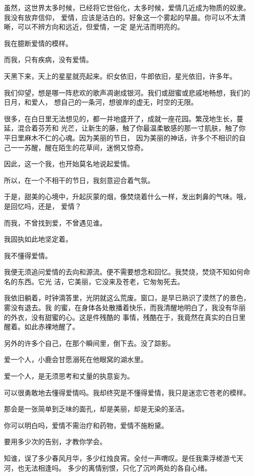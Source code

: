		虽然，这世界太多时候，已经将它世俗化，太多时候，爱情几近成为物质的奴隶。我没有放弃信仰，
	爱情，应该是洁白的。好象这一个雾起的早晨。你可以不太清晰，可以不辨方向和远近，但爱情，一定
	是光洁而明亮的。


		我在臆断爱情的模样。

		而我，只有疾病，没有爱情。


		天黑下来，天上的星星就亮起来。织女依旧，牛郎依旧，星光依旧，许多年。


		我们仰望，想是哪一阵悲欢的歌声凋谢成银河。我们或甜蜜或悲戚地畅想，我们的日月，和爱人，
	想自己的一条河，想彼岸的虚无，时空的无限。

		很多，在白日里无法想见的，都一并地盛开了，成就一座花园。繁茂地生长，蔓延，混合着芬芳和
	光芒，让新生的藤，触了你最温柔敏感的那一寸肌肤，触了你平日里麻木不仁的心魂。因为美丽的节日，
	因为美丽的神话，许多个不相识的自己一一苏醒，醒在陌生的花草间，迷惘又惊奇。

		因此，这一个我，也开始莫名地说起爱情。

		所以，在一个不相干的节日，我刻意迎合着气氛。

		于是，甜美的心境中，升起灰蒙的烟，像焚烧着什么一样，发出刺鼻的气味。哦，是回忆吗，还是，
	爱情？

		而我，不曾找到爱，不曾遇见谁。


		我固执如此地坚定着。

		我不懂得爱情。


		我便无须追问爱情的去向和源流。便不需要想念和回忆。我焚烧，焚烧不知如何命名的东西。它光
	洁，它美丽，它没来及苍老，它匆匆死去。


		我依旧躺着，时钟滴答里，光阴就这么荒废。窗口，是早已熟识了漠然了的景色，雾没有退去。我
	的蜜，在身体各处散播着快乐，而我清醒地明白了，我没有华丽的外衣，没有甜蜜的心。这是件残酷的
	事情，残酷在于，我竟然在真实的白日里醒着。如此赤裸地醒了。


		另外的许多个自己，在那个瞬间里，倒下去。没了踪影。

		爱一个人，小鹿会甘愿溺死在他眼窝的湖水里。

		爱一个人，是无须思考和丈量的执意妄为。

		可以很勇敢地去懂得爱情吗。我却终究是不懂得爱情，我只是迷恋它苍老的模样。

		那会是一张简单到乏味的面孔，却是美丽，却是无染的圣洁。

		你可以明白吗，爱情不需治疗和药物，爱情不施粉黛。

		要用多少次的告别，才教你学会。


		知谁，误了多少春风月华，多少红烛良宵。全付一声喟叹。是任我乘浮槎游弋天河，也无法相逢吗。
	多少的离情别恨，只化了沉吟两处的各自心绪。

